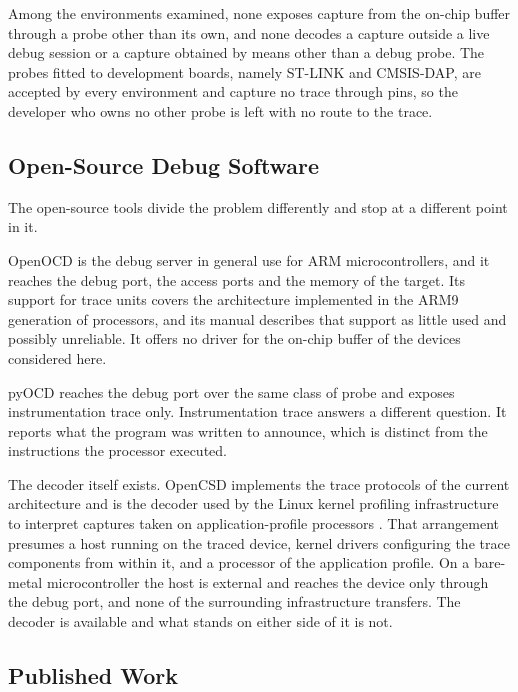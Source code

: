 Among the environments examined, none exposes capture from the on-chip buffer through a probe other than its own, and none decodes a capture outside a live debug session or a capture obtained by means other than a debug probe. The probes fitted to development boards, namely ST-LINK and CMSIS-DAP, are accepted by every environment and capture no trace through pins, so the developer who owns no other probe is left with no route to the trace.

\subsection{Open-Source Debug Software}
\label{subsec:sota_open}

The open-source tools divide the problem differently and stop at a different point in it.

OpenOCD \cite{openocd} is the debug server in general use for ARM microcontrollers, and it reaches the debug port, the access ports and the memory of the target. Its support for trace units covers the architecture implemented in the ARM9 generation of processors, and its manual describes that support as little used and possibly unreliable. It offers no driver for the on-chip buffer of the devices considered here.

pyOCD \cite{pyocd} reaches the debug port over the same class of probe and exposes instrumentation trace only. Instrumentation trace answers a different question. It reports what the program was written to announce, which is distinct from the instructions the processor executed.

The decoder itself exists. OpenCSD \cite{opencsd} implements the trace protocols of the current architecture and is the decoder used by the Linux kernel profiling infrastructure to interpret captures taken on application-profile processors \cite{perf_cs_etm}. That arrangement presumes a host running on the traced device, kernel drivers configuring the trace components from within it, and a processor of the application profile. On a bare-metal microcontroller the host is external and reaches the device only through the debug port, and none of the surrounding infrastructure transfers. The decoder is available and what stands on either side of it is not.

\subsection{Published Work}
\label{subsec:sota_academic}

